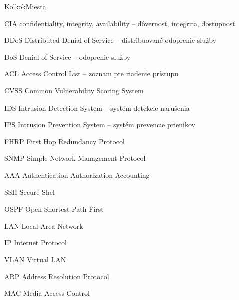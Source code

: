 \begin{seznamzkratek}{KolkokMiesta}

	{CIA} %
	{confidentiality, integrity, availability -- dôvernosť, integrita, dostupnosť} %

	{DDoS} %
	{Distributed Denial of Service -- distribuované odoprenie služby} %
	
	{DoS} %
	{Denial of Service -- odoprenie služby} %

	{ACL} %
	{Access Control List -- zoznam pre riadenie prístupu} %

	{CVSS} %
	{Common Vulnerability Scoring System} %
		
	{IDS} %
	{Intrusion Detection System -- systém detekcie narušenia} %

	{IPS} %
	{Intrusion Prevention System -- systém prevencie prienikov} %

	{FHRP} %
	{First Hop Redundancy Protocol} %

	{SNMP} %
	{Simple Network Management Protocol} %
	
	{AAA} %
	{Authentication Authorization Accounting} %
	
	{SSH} %
	{Secure Shel} %
	
	{OSPF} %
	{Open Shortest Path First} %

	{LAN} %
	{Local Area Network} %

	{IP} %
	{Internet Protocol} %
	
	{VLAN} %
	{Virtual LAN} %
	
	{ARP} %
	{Address Resolution Protocol} %

	{MAC} %
	{Media Access Control} %
	

\end{seznamzkratek}
